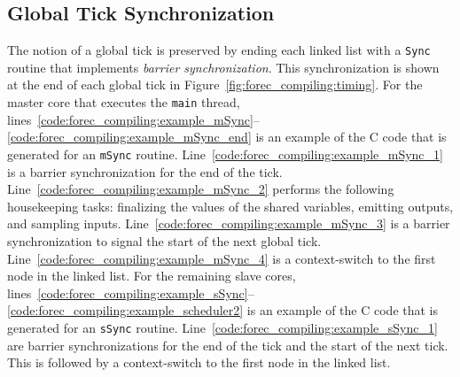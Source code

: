 \subsection{Global Tick Synchronization}
\label{sec:forec_compiling:sync} 
The notion of a global tick is preserved by ending each linked 
list with a \verb$Sync$ routine that implements \emph{barrier synchronization}. 
This synchronization is shown at the end of each global tick in 
Figure~\ref{fig:forec_compiling:timing}.
For the master core that executes the \verb$main$ thread, 
lines~\ref{code:forec_compiling:example_mSync}--\ref{code:forec_compiling:example_mSync_end} 
is an example of the C code that is generated for 
an \verb$mSync$ routine.
Line~\ref{code:forec_compiling:example_mSync_1} is a 
barrier synchronization for the end of the tick. 
Line~\ref{code:forec_compiling:example_mSync_2} 
performs the following housekeeping tasks: finalizing the
values of the shared variables, emitting outputs, and
sampling inputs.
Line~\ref{code:forec_compiling:example_mSync_3} is 
a barrier synchronization to signal the start of the 
next global tick. 
Line~\ref{code:forec_compiling:example_mSync_4} is a
context-switch to the first node in the linked list.
For the remaining slave cores, 
lines~\ref{code:forec_compiling:example_sSync}--\ref{code:forec_compiling:example_scheduler2}
is an example of the C code that is generated for an
\verb$sSync$ routine.
Line~\ref{code:forec_compiling:example_sSync_1} are
barrier synchronizations for the end of the tick
and the start of the next tick. This is followed by 
a context-switch to the first node in the linked list.

%
%



